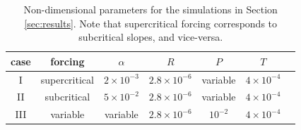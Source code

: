 \begin{table}[h]
\caption{Non-dimensional parameters for the simulations in Section
  \ref{sec:results}. Note that supercritical forcing corresponds to
  subcritical slopes, and vice-versa.}\label{paramsNDb}
\begin{center}
\begin{tabular}{ccccccc}
\hline\hline
case & forcing       & $\alpha$           & $R$                 & $P$               & $T$               \\
\hline
I    & supercritical & $2 \times 10^{-3}$  & $2.8 \times 10^{-6}$ & variable          & $4 \times 10^{-4}$ \\
\hline
II   & subcritical   & $5 \times 10^{-2}$  & $2.8 \times 10^{-6}$ & variable          &  $4 \times 10^{-4}$ \\
\hline
III  & variable      & variable           & $2.8 \times 10^{-6}$ & $10^{-2}$ &  $4 \times 10^{-4}$ \\
\hline
\end{tabular}
\end{center}
\end{table}

